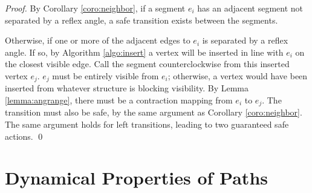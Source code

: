\documentclass[]{styles/svproc}  %
\begin{document}
\begin{proof}
By Corollary \ref{coro:neighbor}, if a segment
$e_i$ has an adjacent segment not separated by a reflex angle, a safe
transition exists between the segments.

Otherwise, if one or more of the adjacent edges to $e_i$ is
separated by a reflex angle. If so, by Algorithm \ref{algo:insert} a vertex
will be inserted in line with $e_i$ on the closest visible edge. Call the
segment counterclockwise from this inserted vertex $e_j$.
$e_j$ must be entirely visible from $e_i$; otherwise, a vertex would have been
inserted from whatever structure is blocking visibility. By Lemma
\ref{lemma:angrange}, there must be a contraction mapping from $e_i$ to $e_j$.
The transition must also be safe, by the same argument as Corollary
\ref{coro:neighbor}. The same argument holds for left transitions, leading to
two guaranteed safe actions.
\qed
\end{proof}



%
%



\section{Dynamical Properties of Paths}
\end{document}
